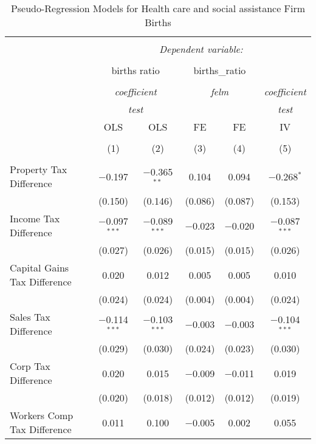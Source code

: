 
\begin{table}[!htbp] \centering 
  \caption{Pseudo-Regression Models for  Health care and social assistance Firm Births} 
  \label{} 
\begin{tabular}{@{\extracolsep{5pt}}lccccc} 
\\[-1.8ex]\hline 
\hline \\[-1.8ex] 
 & \multicolumn{5}{c}{\textit{Dependent variable:}} \\ 
\cline{2-6} 
\\[-1.8ex] & \multicolumn{2}{c}{births ratio} & \multicolumn{2}{c}{births\_ratio} &   \\ 
\\[-1.8ex] & \multicolumn{2}{c}{\textit{coefficient}} & \multicolumn{2}{c}{\textit{felm}} & \textit{coefficient} \\ 
 & \multicolumn{2}{c}{\textit{test}} & \multicolumn{2}{c}{\textit{}} & \textit{test} \\ 
 & OLS & OLS & FE & FE & IV \\ 
\\[-1.8ex] & (1) & (2) & (3) & (4) & (5)\\ 
\hline \\[-1.8ex] 
 Property Tax Difference & $-$0.197 & $-$0.365$^{**}$ & 0.104 & 0.094 & $-$0.268$^{*}$ \\ 
  & (0.150) & (0.146) & (0.086) & (0.087) & (0.153) \\ 
  Income Tax Difference & $-$0.097$^{***}$ & $-$0.089$^{***}$ & $-$0.023 & $-$0.020 & $-$0.087$^{***}$ \\ 
  & (0.027) & (0.026) & (0.015) & (0.015) & (0.026) \\ 
  Capital Gains Tax Difference & 0.020 & 0.012 & 0.005 & 0.005 & 0.010 \\ 
  & (0.024) & (0.024) & (0.004) & (0.004) & (0.024) \\ 
  Sales Tax Difference & $-$0.114$^{***}$ & $-$0.103$^{***}$ & $-$0.003 & $-$0.003 & $-$0.104$^{***}$ \\ 
  & (0.029) & (0.030) & (0.024) & (0.023) & (0.030) \\ 
  Corp Tax Difference & 0.020 & 0.015 & $-$0.009 & $-$0.011 & 0.019 \\ 
  & (0.020) & (0.018) & (0.012) & (0.012) & (0.019) \\ 
  Workers Comp Tax Difference & 0.011 & 0.100 & $-$0.005 & 0.002 & 0.055 \\ 

\end{tabular}
\end{table}
